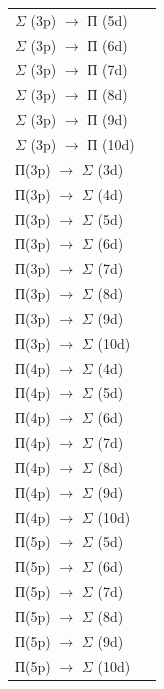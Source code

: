 \begin{flushleft}
\begin{supertabular}{|m{6.577cm}|m{6.801cm}|}
{$\Sigma $ (3p) $\rightarrow $ П (5d)} &
\raggedleft{}\\
{$\Sigma $ (3p) $\rightarrow $ П (6d)} &
\raggedleft{}\\
{$\Sigma $ (3p) $\rightarrow $ П (7d)} &
\raggedleft{}\\
{$\Sigma $ (3p) $\rightarrow $ П (8d)} &
\raggedleft{}\\
{$\Sigma $ (3p) $\rightarrow $ П (9d)} &
\raggedleft{}\\
{$\Sigma $ (3p) $\rightarrow $ П (10d)} &
\raggedleft{}\\\hline
{П(3p) $\rightarrow $ $\Sigma $ (3d)} &
\raggedleft{}\\
{П(3p) $\rightarrow $ $\Sigma $ (4d)} &
\raggedleft{}\\
{П(3p) $\rightarrow $ $\Sigma $ (5d)} &
\raggedleft{}\\
{П(3p) $\rightarrow $ $\Sigma $ (6d)} &
\raggedleft{}\\
{П(3p) $\rightarrow $ $\Sigma $ (7d)} &
\raggedleft{}\\
{П(3p) $\rightarrow $ $\Sigma $ (8d)} &
\raggedleft{}\\
{П(3p) $\rightarrow $ $\Sigma $ (9d)} &
\raggedleft{}\\
{П(3p) $\rightarrow $ $\Sigma $ (10d)} &
\raggedleft{}\\\hline
{П(4p) $\rightarrow $ $\Sigma $ (4d)} &
\raggedleft{}\\
{П(4p) $\rightarrow $ $\Sigma $ (5d)} &
\raggedleft{}\\
{П(4p) $\rightarrow $ $\Sigma $ (6d)} &
\raggedleft{}\\
{П(4p) $\rightarrow $ $\Sigma $ (7d)} &
\raggedleft{}\\
{П(4p) $\rightarrow $ $\Sigma $ (8d)} &
\raggedleft{}\\
{П(4p) $\rightarrow $ $\Sigma $ (9d)} &
\raggedleft{}\\
{П(4p) $\rightarrow $ $\Sigma $ (10d)} &
\raggedleft{}\\\hline
{П(5p) $\rightarrow $ $\Sigma $ (5d)} &
\raggedleft{}\\
{П(5p) $\rightarrow $ $\Sigma $ (6d)} &
\raggedleft{}\\
{П(5p) $\rightarrow $ $\Sigma $ (7d)} &
\raggedleft{}\\
{П(5p) $\rightarrow $ $\Sigma $ (8d)} &
\raggedleft{}\\
{П(5p) $\rightarrow $ $\Sigma $ (9d)} &
\raggedleft{}\\
{П(5p) $\rightarrow $ $\Sigma $ (10d)} &
\raggedleft{}\\\hline
\end{supertabular}
\end{flushleft}
